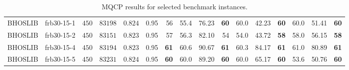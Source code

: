 \documentclass[draft,final]{vutinfth} %
\begin{document}
\begin{table}
{\begin{tabular}{llrrrr | rrr rrr rrr r}
        BHOSLIB & frb30-15-1 & $450$ & $83198$ & $0.824$ & 0.95 & 56 & 55.4 & 76.23 & \textbf{60} & 60.0 & 42.23 & \textbf{60} & 60.0 & 51.41 & \textbf{60}\\
        BHOSLIB & frb30-15-2 & $450$ & $83151$ & $0.823$ & 0.95 & 57 & 56.3 & 82.10 & 54 & 54.0 & 43.72 & \textbf{58} & 58.0 & 56.15 & \textbf{58} \\
        BHOSLIB & frb30-15-4 & $450$ & $83194$ & $0.823$ & 0.95 & \textbf{61} & 60.6 & 90.67 & \textbf{61} & 60.3 & 84.17 & \textbf{61} & 61.0 & 80.89 & \textbf{61} \\
        BHOSLIB & frb30-15-5 & $450$ & $83231$ & $0.824$ & 0.95 & \textbf{60} & 60.0 & 89.20 & \textbf{60} & 60.0 & 65.17 & \textbf{60} & 53.6 & 50.76 & \textbf{60} \\
    \end{tabular}
    }
    \caption{MQCP results for selected benchmark instances.}
    \label{tab:mqcp-benchmark}
\end{table}
\end{document}
